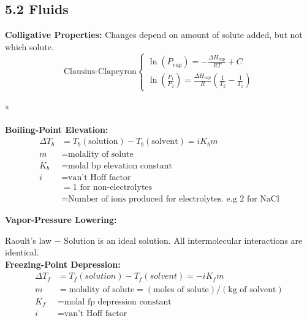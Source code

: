 \subsection{5.2 Fluids}
    \textbf{Colligative Properties: }Changes depend on amount of solute added, but not which solute.
    $$
    \text{Clausius-Clapeyron} \left\{
        \begin{array}{ll}
            \ln(P_{vap}) = - \frac{\Delta H_{vap}}{RT} + C\\
            \ln(\frac{P_1}{P_2}) = \frac{\Delta H_{vap}}{R} \left( \frac{1}{T_2} - \frac{1}{T_1} \right)
        \end{array}
        \right.
    $$\\*


    \textbf{Boiling-Point Elevation:}
    \begin{align*}
        \Delta T_b & = T_b (\textrm{solution}) - T_b (\textrm{solvent}) = iK_b m\\
        m & = \text{molality of solute}\\
        K_b & = \text{molal bp elevation constant}\\
        i & = \text{van't Hoff factor}\\
        & = 1 \text{ for non-electrolytes}\\
        & = \text{Number of ions produced for electrolytes.\ e.g 2 for NaCl}
    \end{align*}
    
    \textbf{Vapor-Pressure Lowering: }
    
        Raoult's law $-$ Solution is an ideal solution. All intermolecular interactions are identical.\\

    \textbf{Freezing-Point Depression: }
        \begin{align*}
            \Delta T_f & = T_f (solution) - T_f (solvent) = -iK_{f}m\\
            m & = \text{molality of solute} = (\textrm{moles of solute}) / (\textrm{kg of solvent})\\
            K_f & = \text{molal fp depression constant}\\
            i & = \text{van't Hoff factor}
        \end{align*}